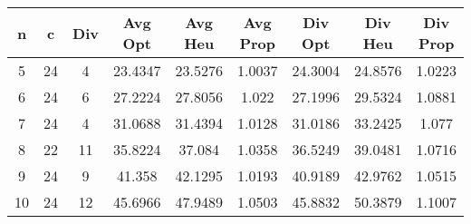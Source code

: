 \begin{tabular}{ | c || c | c || c | c | c || c | c | c | }
\hline
{\bf n} & {\bf c} & {\bf Div} & {\bf Avg Opt} & {\bf Avg Heu} & {\bf Avg Prop} & {\bf Div Opt} & {\bf Div Heu} & {\bf Div Prop} \\ \hline
5 & 24 & 4 & 23.4347 & 23.5276 & 1.0037 & 24.3004 & 24.8576 & 1.0223 \\ \hline
6 & 24 & 6 & 27.2224 & 27.8056 & 1.022 & 27.1996 & 29.5324 & 1.0881 \\ \hline
7 & 24 & 4 & 31.0688 & 31.4394 & 1.0128 & 31.0186 & 33.2425 & 1.077 \\ \hline
8 & 22 & 11 & 35.8224 & 37.084 & 1.0358 & 36.5249 & 39.0481 & 1.0716 \\ \hline
9 & 24 & 9 & 41.358 & 42.1295 & 1.0193 & 40.9189 & 42.9762 & 1.0515 \\ \hline
10 & 24 & 12 & 45.6966 & 47.9489 & 1.0503 & 45.8832 & 50.3879 & 1.1007 \\ \hline
\end{tabular}